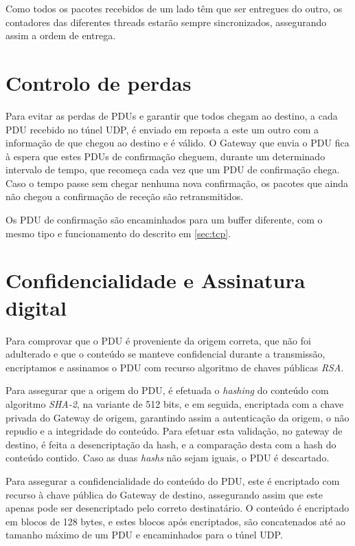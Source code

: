 \documentclass[a4paper]{report}
\begin{document}
Como todos os pacotes recebidos de um lado têm que ser entregues do outro,
os contadores das diferentes threads estarão sempre sincronizados, assegurando
assim a ordem de entrega.

\section{Controlo de perdas}

Para evitar as perdas de PDUs e garantir que todos chegam ao destino, a cada 
PDU recebido no túnel UDP, é enviado em reposta a este um outro com a
informação de que chegou ao destino e é válido. O Gateway que envia o PDU
fica à espera que estes PDUs de confirmação cheguem, durante um determinado
intervalo de tempo, que recomeça cada vez que um PDU de confirmação chega.
Caso o tempo passe sem chegar nenhuma nova confirmação, os pacotes que ainda
não chegou a confirmação de receção são retransmitidos.

Os PDU de confirmação são encaminhados para um buffer diferente, com o mesmo
tipo e funcionamento do descrito em \ref{sec:tcp}.

\section{Confidencialidade e Assinatura digital} \label{sec:auth}

Para comprovar que o PDU é proveniente da origem correta, que não foi
adulterado e que o conteúdo se manteve confidencial durante a transmissão,
encriptamos e assinamos o PDU com recurso algoritmo de chaves públicas 
\textit{RSA}. 

Para assegurar que a origem do PDU, é efetuada o \textit{hashing} do conteúdo
com algoritmo \textit{SHA-2}, na variante de 512 bits, e em seguida, encriptada
com a chave privada do Gateway de origem, garantindo assim a autenticação da
origem, o não repudio e a integridade do conteúdo. Para efetuar esta validação,
no gateway de destino, é feita a desencriptação da hash, e a comparação desta 
com a hash do conteúdo contido. Caso as duas \textit{hashs} não sejam iguais, o
PDU é descartado.

Para assegurar a confidencialidade do conteúdo do PDU, este é encriptado com
recurso à chave pública do Gateway de destino, assegurando assim que este
apenas pode ser desencriptado pelo correto destinatário. O conteúdo é 
encriptado em blocos de 128 bytes, e estes blocos após encriptados, são
concatenados até ao tamanho máximo de um PDU e encaminhados para o túnel
UDP.
\end{document}
